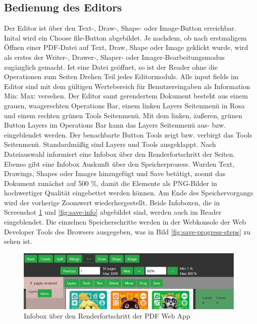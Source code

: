 \subsection{Bedienung des Editors}
Der Editor ist über den Text-, Draw-, Shape- oder Image-Button erreichbar. Inital wird ein Choose file-Button abgebildet. Je nachdem, ob nach erstmaligem Öffnen einer PDF-Datei auf Text, Draw, Shape oder Image geklickt wurde, wird als erstes der Writer-, Drawer-, Shaper- oder Imager-Bearbeitungsmodus zugänglich gemacht. Ist eine Datei geöffnet, so ist der Reader ohne die Operationen zum Seiten Drehen Teil jedes Editormoduls. Alle input fields im Editor sind mit dem gültigen Wertebereich für Benutzereingaben als Information Min: Max: versehen. Der Editor samt gerendertem Dokument besteht aus einem grauen, waagerechten Operations Bar, einem linken Layers Seitenmenü in Rosa und einem rechten grünen Tools Seitenmenü. Mit dem linken, äußeren, grünen Button Layers im Operations Bar kann das Layers Seitenmenü aus- bzw. eingeblendet werden. Der benachbarte Button Tools zeigt bzw. verbirgt das Tools Seitenmenü. Standardmäßig sind Layers und Tools ausgeklappt. Nach Dateiauswahl informiert eine Infobox über den Renderfortschritt der Seiten. Ebenso gibt eine Infobox Auskunft über den Speicherprozess. Wurden Text, Drawings, Shapes oder Images hinzugefügt und Save betätigt, zoomt das Dokument zunächst auf 500 \%, damit die Elemente als PNG-Bilder in hochwertiger Qualität eingebettet werden können. Am Ende des Speichervorgangs wird der vorherige Zoomwert wiederhergestellt. Beide Infoboxen, die in Screenshot \ref{fig:render-info} und \ref{fig:save-info} abgebildet sind, werden auch im Reader eingeblendet. Die einzelnen Speicherschritte werden in der Webkonsole der Web Developer Tools des Browsers ausgegeben, was in Bild \ref{fig:save-progress-steps} zu sehen ist.

\begin{figure}[!htbp]
	\centering
	\includegraphics[width=1\textwidth]{"images/render-info.png"}
	\caption{Infobox über den Renderfortschritt der PDF Web App}
	\label{fig:render-info}
\end{figure}

